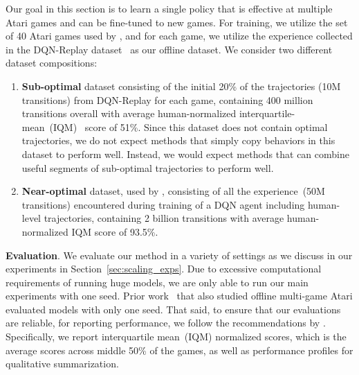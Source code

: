 Our goal in this section is to learn a single policy that is effective at multiple Atari games and can be fine-tuned to new games. For training, we utilize the set of 40 Atari games used by \citet{lee2022multi}, and for each game, we utilize the experience collected in the DQN-Replay dataset~\citep{agarwal2019optimistic} as our offline dataset. We consider two different dataset compositions: 
\begin{enumerate}
    \item \textbf{Sub-optimal} dataset consisting of the initial 20\% of the trajectories (10M transitions) from DQN-Replay for each game, containing 400 million transitions overall with average human-normalized interquartile-mean~(IQM)~\citep{agarwal2021deep} score of 51\%. Since this dataset does not contain optimal trajectories, we do not expect methods that simply copy behaviors in this dataset to perform well. Instead, we would expect methods that can combine useful segments of sub-optimal trajectories to perform well. 
    \item  \textbf{Near-optimal} dataset, used by \citet{lee2022multi}, consisting of all the experience~(50M transitions) encountered during training of a DQN agent including human-level trajectories, containing 2 billion transitions with average human-normalized IQM score of 93.5\%. 
\end{enumerate}

\textbf{Evaluation}. We evaluate our method in a variety of settings as we discuss in our experiments in Section~\ref{sec:scaling_exps}. Due to excessive computational requirements of running huge models, we are only able to run our main experiments with one seed. Prior work~\citep{lee2022multi} that also studied offline multi-game Atari evaluated models with only one seed. That said, to ensure that our evaluations are reliable, for reporting performance, we follow the recommendations by \citet{agarwal2021deep}. Specifically, we report interquartile mean~(IQM) normalized scores, which is the average scores across middle 50\% of the games, as well as performance profiles for qualitative summarization. 

